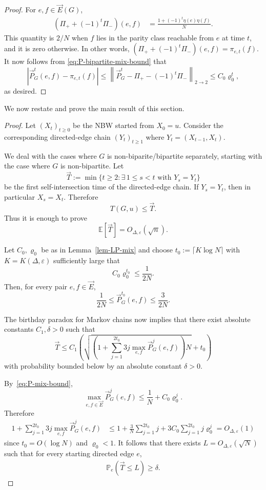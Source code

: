 \documentclass[11pt,a4paper]{article}
\theoremstyle{plain}
\let\rho=\varrho
\let\epsilon=\varepsilon
\begin{document}
\begin{proof}
For $e,f\in\vec E(G)$,
\[
\begin{aligned}
\left(\Pi_++(-1)^t\Pi_-\right)(e,f)
&=
\frac{1+(-1)^t\eta(e)\eta(f)}{N}.
\end{aligned}
\]
This quantity is $2/N$ when $f$ lies in the parity class reachable
from $e$ at time $t$, and it is zero otherwise. In other words, 
$
\left(\Pi_++(-1)^t\Pi_-\right)(e,f)
=
\pi_{e,t}(f).
$
It now follows from \eqref{eq:P-bipartite-mix-bound} that
\[
\left|
\vec P_G^t(e,f)-\pi_{e,t}(f)
\right|
\le
\left\|
\vec P_G^t-\Pi_+-(-1)^t\Pi_-
\right\|_{2\to2}
\le
C_0\rho_0^t,
\]
as desired.
\end{proof}


We now restate and prove the main result of this section. 

\thmUBexpander* 

\begin{proof}
Let $(X_t)_{t\ge 0}$ be the NBW started
from $X_0=u$. Consider the corresponding directed-edge chain $(Y_t)_{t\ge 1}$ where $Y_t=(X_{t-1},X_t)$. 

We deal with the cases where $G$ is non-biparite/bipartite separately, starting with the case where $G$ is non-bipartite. 
Let
\[
\vec{T}
:=
\min\{t\ge 2:\exists\,1\le s<t\text{ with }Y_s=Y_t\}
\]
be the first self-intersection time of the directed-edge chain. 
If
\(Y_s=Y_t\), then in particular \(X_s=X_t\). Therefore
\[
T(G,u)\le \vec{T}.
\]
Thus it is enough to prove
\[
\mathbb E[\vec{T}]=O_{\Delta,\varepsilon}(\sqrt n).
\]







Let $C_0,\rho_0$ be as in Lemma~\ref{lem-LP-mix} and  
choose
\(
t_0:=\lceil K\log N\rceil
\)
with \(K=K(\Delta,\varepsilon)\) sufficiently large that
\[
C_0\rho_0^{t_0}\le \frac1{2N}.
\]
Then, for every pair \(e,f\in\vec E\),
\[
\frac1{2N}
\le
\vec P_G^{t_0}(e,f)
\le
\frac{3}{2N}.                   
\]


The birthday paradox for Markov chains \cite[Theorem 3.6]{kim2008birthday} now implies that there exist absolute constants $C_1,\delta>0$ such that 
\[
\vec{T}\leq
C_1\left(
\sqrt{
\left(
1+\sum_{j=1}^{2t_0}3j\max_{e,f} \vec{P}_G^j(e,f)
\right)N
}
+t_0
\right)
\]
with probability bounded below by an absolute constant  $\delta>0$.

By~\eqref{eq:P-mix-bound},
\[
\max_{e,f\in\vec E}\vec P_G^j(e,f)
\le
\frac1N+C_0\rho_0^j.
\]
Therefore
\[
\begin{aligned}
1+\sum_{j=1}^{2t_0}3j\max_{e,f}\vec P_G^j(e,f)
&\le
1+\frac3N\sum_{j=1}^{2t_0}j
+3C_0\sum_{j=1}^{2t_0}j\rho_0^j = O_{\Delta,\epsilon}(1) 
\end{aligned}
\]
since \(t_0=O(\log N)\) and $\rho_0<1$. 
It follows that there exists $L=O_{\Delta,\epsilon}(\sqrt{N})$
such that for every
starting directed edge \(e\),
\begin{align}\label{eq:tau-L-bound}
\mathbb P_e(\vec{T}\le L)\ge \delta.              
\end{align}



\end{proof}
\end{document}
